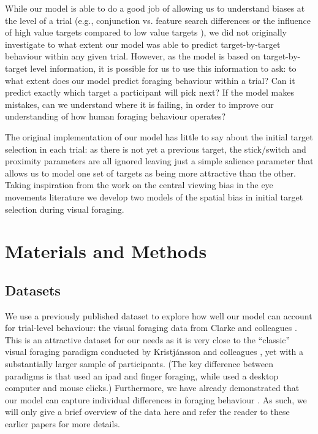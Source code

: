 \documentclass[vision,article,accept,pdftex,moreauthors]{Definitions/mdpi}
\begin{document}
While our model is able to do a good job of allowing us to understand biases at the level of a trial (e.g., conjunction vs. feature search differences \cite{kristjansson2014} or the influence of high value targets compared to low value targets \cite{tagu2020}), we did not originally investigate to what extent our model was able to predict target-by-target behaviour within any given trial. However, as the model is based on target-by-target level information, it is possible for us to use this information to ask: to what extent does our model predict foraging behaviour within a trial? Can it predict exactly which target a participant will pick next? If the model makes mistakes, can we understand where it is failing, in order to improve our understanding of how human foraging behaviour operates?

The original implementation of our model has little to say about the initial target selection in each trial: as there is not yet a previous target, the stick/switch and proximity parameters are all ignored leaving just a simple salience parameter that allows us to model one set of targets as being more attractive than the other. Taking inspiration from the work on the central viewing bias in the eye movements literature \cite{clarke2014deriving, clarke2017} we develop two models of the spatial bias in initial target selection during visual foraging.  

\section{Materials and Methods}

\subsection{Datasets}

We use a previously published dataset to explore how well our model can account for trial-level behaviour: the visual foraging data from Clarke and colleagues \cite{clarke2022}. This is an attractive dataset for our needs as it is very close to the ``classic'' visual foraging paradigm conducted by Kristjánsson and colleagues \citep{kristjansson2014}, yet with a substantially larger sample of participants. (The key difference between paradigms is that \cite{kristjansson2014} used an ipad and finger foraging, while \cite{clarke2022} used a desktop computer and mouse clicks.) Furthermore, we have already demonstrated that our model can capture individual differences in foraging behaviour \citep{clarke2022}. As such, we will only give a brief overview of the data here and refer the reader to these earlier papers for more details.
\end{document}
